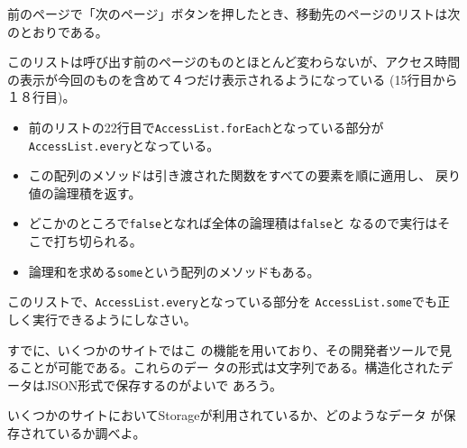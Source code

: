 \begin{Exec}
\begin{itemize}
 \end{itemize}
前のページで「次のページ」ボタンを押したとき、移動先のページのリストは次
 のとおりである。
\end{Exec}
このリストは呼び出す前のページのものとほとんど変わらないが、アクセス時間
の表示が今回のものを含めて４つだけ表示されるようになっている
(15行目から１８行目)。
\begin{itemize}
 \item 前のリストの22行目で\Verb+AccessList.forEach+となっている部分が
			 \Verb+AccessList.every+となっている。
 \item この配列のメソッドは引き渡された関数をすべての要素を順に適用し、
			 戻り値の論理積を返す。
 \item どこかのところで\Verb+false+となれば全体の論理積は\Verb+false+と
			 なるので実行はそこで打ち切られる。
 \item 論理和を求める\Verb+some+という配列のメソッドもある。
\end{itemize}
 \begin{Prob}\upshape
	このリストで、\Verb+AccessList.every+となっている部分を
	\Verb+AccessList.some+でも正しく実行できるようにしなさい。
\end{Prob}

すでに、いくつかのサイトではこ
の機能を用いており、その開発者ツールで見ることが可能である。これらのデー
タの形式は文字列である。構造化されたデータはJSON形式で保存するのがよいで
あろう。
\begin{Prob}\upshape
いくつかのサイトにおいてStorageが利用されているか、どのようなデータ
 が保存されているか調べよ。
\end{Prob}
